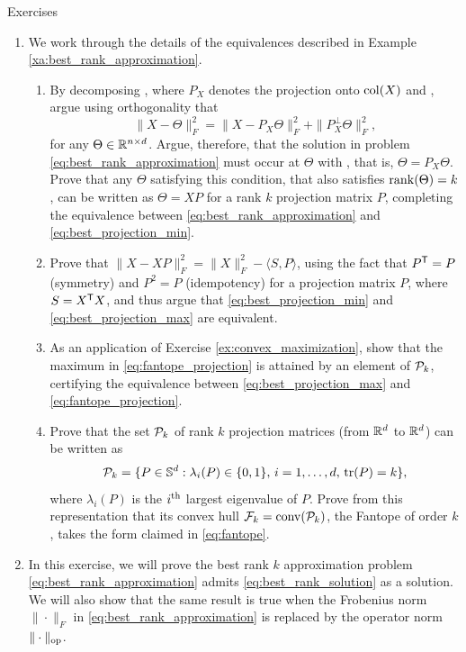 \begin{xcb}{Exercises}
\begin{enumerate}[label=\thechapter.\arabic*]
\item \label{ex:best_rank_approximation}
  We work through the details of the equivalences described in Example
  \ref{xa:best_rank_approximation}.  

\begin{enumerate}[label=\alph*.]
\item By decomposing , where 
  $P_X$ denotes the projection onto $\operatorname{col}(X)$ and ,
  argue using orthogonality that 
  \[
  \|X - \Theta\|_F^2 = \|X - P_X \Theta\|_F^2 + \|P_X^\perp \Theta\|_F^2,
  \]
  for any $\Theta \in \mathbb{R}^{n \times d}$. Argue, therefore, that the solution in 
  problem \eqref{eq:best_rank_approximation} must occur at $\Theta$ with 
  , that is, $\Theta = P_X \Theta$. Prove that any
  $\Theta$ satisfying this condition, that also satisfies $\operatorname{rank}(\Theta) = k$,
  can be written as $\Theta = XP$ for a rank $k$ projection matrix $P$,
  completing the equivalence between \eqref{eq:best_rank_approximation} and  
  \eqref{eq:best_projection_min}. 

\item Prove that $\|X - XP\|_F^2 = \|X\|_F^2 - \langle S, P \rangle$, using the
  fact that $P^{\mathsf{T}} = P$ (symmetry) and $P^2 = P$ (idempotency) for a projection
  matrix $P$, where $S = X^{\mathsf{T}} X$, and thus argue that
  \eqref{eq:best_projection_min} and \eqref{eq:best_projection_max} are
  equivalent. 

\item As an application of Exercise \ref{ex:convex_maximization}, show that
  the maximum in \eqref{eq:fantope_projection} is attained by an element of 
  $\mathcal{P}_k$, certifying the equivalence between \eqref{eq:best_projection_max} and
  \eqref{eq:fantope_projection}.

\item Prove that the set $\mathcal{P}_k$ of rank $k$ projection matrices (from $\mathbb{R}^d$ to 
  $\mathbb{R}^d$) can be written as
  \[
  \mathcal{P}_k = \{ P \in \mathbb{S}^d : \lambda_i(P) \in \{0,1\}, \, i=1,\dots,d, \, \operatorname{tr}(P)
  = k\},
  \]
  where $\lambda_i(P)$ is the $i^{\textnormal{th}}$ largest eigenvalue of $P$. Prove from this 
  representation that its convex hull $\mathcal{F}_k = \operatorname{conv}(\mathcal{P}_k)$, the Fantope of
  order $k$, takes the form claimed in \eqref{eq:fantope}. 
\end{enumerate}

\item In this exercise, we will prove the best rank $k$ approximation problem 
  \eqref{eq:best_rank_approximation} admits \eqref{eq:best_rank_solution} as a
  solution. We will also show that the same result is true when the Frobenius
  norm $\|\cdot\|_F$ in \eqref{eq:best_rank_approximation} is replaced by the 
  operator norm $\|\cdot\|_{\mathrm{op}}$. 


\end{enumerate}
\end{xcb}
